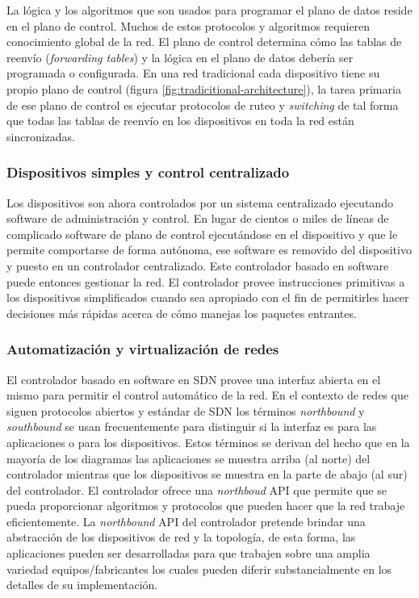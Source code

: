 \documentclass[10pt,journal,compsoc]{IEEEtran}
\begin{document}
La lógica y los algoritmos que son usados para programar el plano de datos reside en el plano de control. Muchos de estos protocolos y algoritmos requieren conocimiento global de la red. El plano de control determina cómo las tablas de reenvío (\emph{forwarding tables}) y la lógica en el plano de datos debería ser programada o configurada. En una red tradicional cada dispositivo tiene su propio plano de control (figura \ref{fig:tradicitional-architecture}), la tarea primaria de ese plano de control es ejecutar protocolos de ruteo y \emph{switching} de tal forma que todas las tablas de reenvío en los dispositivos en toda la red están sincronizadas.

\subsubsection{Dispositivos simples y control centralizado}
Los dispositivos son ahora controlados por un sistema centralizado ejecutando software de administración y control. En lugar de cientos o miles de líneas de complicado software de plano de control ejecutándose en el dispositivo y que le permite comportarse de forma autónoma, ese software es removido del dispositivo y puesto en un controlador centralizado. Este controlador basado en software puede entonces gestionar la red. El controlador provee instrucciones primitivas a los dispositivos simplificados cuando sea apropiado con el fin de permitirles hacer decisiones más rápidas acerca de cómo manejas los paquetes entrantes.

\subsubsection{Automatización y virtualización de redes}
El controlador basado en software en SDN provee una interfaz abierta en el mismo para permitir el control automático de la red. En el contexto de redes que siguen protocolos abiertos y estándar de SDN los términos \emph{northbound} y \emph{southbound} se usan frecuentemente para distinguir si la interfaz es para las aplicaciones o para los dispositivos. Estos términos se derivan del hecho que en la mayoría de los diagramas las aplicaciones se muestra arriba (al norte) del controlador mientras que los dispositivos se muestra en la parte de abajo (al sur) del controlador. El controlador ofrece una \emph{northboud} API que permite que se pueda proporcionar algoritmos y protocolos que pueden hacer que la red trabaje eficientemente. La \emph{northbound} API del controlador pretende brindar una abstracción de los dispositivos de red y la topología, de esta forma, las aplicaciones pueden ser desarrolladas para que trabajen sobre una amplia variedad equipos/fabricantes los cuales pueden diferir substancialmente en los detalles de su implementación.
\end{document}
